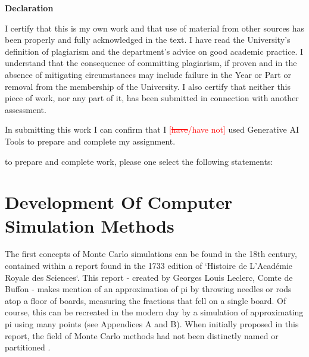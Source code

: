 \documentclass[11pt,a4paper]{article}
\begin{document}
\newpage
\Large\textbf{Declaration}
\normalsize

I certify that this is my own work and that use of material from other sources has been properly and fully acknowledged in the text. I have read the University’s definition of plagiarism and the department’s advice on good academic practice. I understand that the consequence of committing plagiarism, if proven and in the absence of mitigating circumstances may include failure in the Year or Part or removal from the membership of the University. I also certify that neither this piece of work, nor any part of it, has been submitted in connection with another assessment.

In submitting this work I can confirm that I \textcolor{red}{[\sout{have}/have not]} used Generative AI Tools to prepare and complete my assignment.  

to prepare and complete work, please one select the following statements:


\newpage

\tableofcontents
\listoftables
\vspace*{0.05\textheight}
\listoffigures

\newpage
{}


\section{Development Of Computer Simulation Methods}

The first concepts of Monte Carlo simulations can be found in the 18th century, contained within a report found in the 1733 edition of `Histoire de L'Académie Royale des Sciences`.
This report - created by Georges Louis Leclerc, Comte de Buffon - makes mention of an approximation of pi by throwing needles or rods atop a floor of boards, measuring the fractions that fell on a single board.
Of course, this can be recreated in the modern day by a simulation of approximating pi using many points (see Appendices A and B).
When initially proposed in this report, the field of Monte Carlo methods had not been distinctly named or partitioned \citep{Landau21}.
\end{document}
